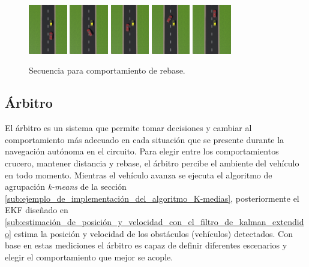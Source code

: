 \begin{figure}[h]
    \centering
    \includegraphics[width=0.15\textwidth]{Figures/Figures_Cap06/pass_1.png}
    \includegraphics[width=0.15\textwidth]{Figures/Figures_Cap06/pass_2.png}
    \includegraphics[width=0.15\textwidth]{Figures/Figures_Cap06/pass_3.png}
    \includegraphics[width=0.15\textwidth]{Figures/Figures_Cap06/pass_4.png}
    \includegraphics[width=0.15\textwidth]{Figures/Figures_Cap06/pass_5.png}
    \caption{Secuencia para comportamiento de rebase.}
    \label{fig:pass_behavior}
\end{figure}

\subsection{Árbitro} \label{sub:árbitro}

El árbitro es un sistema que permite tomar decisiones y cambiar al comportamiento más adecuado en cada situación que se presente durante la navegación autónoma en el circuito. Para elegir entre los comportamientos crucero, mantener distancia y rebase, el árbitro percibe el ambiente del vehículo en todo momento. Mientras el vehículo avanza se ejecuta el algoritmo de agrupación \textit{k-means} de la sección \ref{sub:ejemplo_de_implementación_del_algoritmo_K-medias}, posteriormente el EKF diseñado en \ref{sub:estimación_de_posición_y_velocidad_con_el_filtro_de_kalman_extendido} estima la posición y velocidad de los obstáculos (vehículos) detectados. Con base en estas mediciones el árbitro es capaz de definir diferentes escenarios y elegir el comportamiento que mejor se acople.

